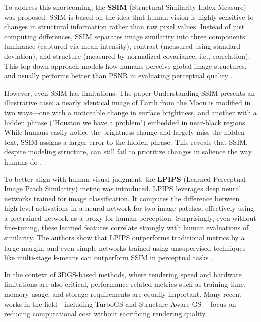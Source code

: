 \documentclass[10pt,twocolumn]{article}
\begin{document}
To address this shortcoming, the \textbf{SSIM} (Structural Similarity Index Measure) was proposed. SSIM is based on the idea that human vision is highly sensitive to changes in structural information rather than raw pixel values. Instead of just computing differences, SSIM separates image similarity into three components: luminance (captured via mean intensity), contrast (measured using standard deviation), and structure (measured by normalized covariance, i.e., correlation). This top-down approach models how humans perceive global image structures, and usually performs better than PSNR in evaluating perceptual quality \cite{1284395}.

However, even SSIM has limitations. The paper Understanding SSIM presents an illustrative case: a nearly identical image of Earth from the Moon is modified in two ways—one with a noticeable change in surface brightness, and another with a hidden phrase ("Houston we have a problem") embedded in near-black regions. While humans easily notice the brightness change and largely miss the hidden text, SSIM assigns a larger error to the hidden phrase. This reveals that SSIM, despite modeling structure, can still fail to prioritize changes in salience the way humans do \cite{nilsson2020understandingssim}.

To better align with human visual judgment, the \textbf{LPIPS} (Learned Perceptual Image Patch Similarity) metric was introduced. LPIPS leverages deep neural networks trained for image classification. It computes the difference between high-level activations in a neural network for two image patches, effectively using a pretrained network as a proxy for human perception. Surprisingly, even without fine-tuning, these learned features correlate strongly with human evaluations of similarity. The authors show that LPIPS outperforms traditional metrics by a large margin, and even simple networks trained using unsupervised techniques like multi-stage k-means can outperform SSIM in perceptual tasks \cite{zhang2018unreasonableeffectivenessdeepfeatures}.

In the context of 3DGS-based methods, where rendering speed and hardware limitations are also critical, performance-related metrics such as training time, memory usage, and storage requirements are equally important. Many recent works in the field—including TurboGS \cite{lu2024turbogsaccelerating3dgaussian} and Structure-Aware GS \cite{ververas2024sagsstructureaware3dgaussian}—focus on reducing computational cost without sacrificing rendering quality.
\end{document}
